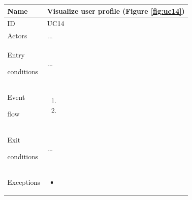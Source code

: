 \begin{center}
    \def\arraystretch{1.5}
    \begin{tabular}{| m{2cm} | m{10cm}|}
        \hline
        Name                  & Visualize user profile  (Figure \ref{fig:uc14}) \\ \hline
        ID                    & UC14                                            \\ \hline
        Actors                & ...                                             \\ \hline
        Entry \par conditions & ...                                             \\ \hline
        Event \par flow       & \begin{enumerate}
                                    \item
                                    \item
                                \end{enumerate}                                \\ \hline
        Exit \par conditions  & ...                                             \\ \hline
        Exceptions            & \begin{itemize}
                                    \item
                                \end{itemize}                                  \\ \hline
    \end{tabular}
\end{center}

